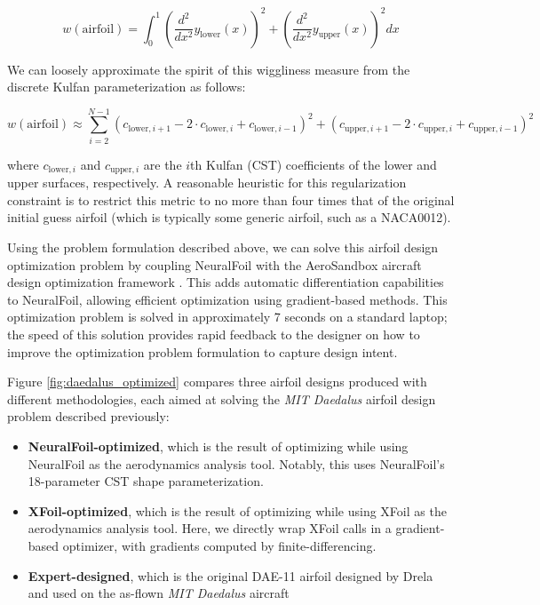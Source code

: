 $$w(\mathrm{airfoil}) = \int_0^1 \left( \frac{d^2}{dx^2} y_\mathrm{lower}(x) \right)^2 + \left( \frac{d^2}{dx^2} y_\mathrm{upper}(x) \right)^2 dx$$

\noindent We can loosely approximate the spirit of this wiggliness measure from the discrete Kulfan parameterization as follows:

$$w(\mathrm{airfoil}) \approx \sum_{i=2}^{N-1} \left(c_{\mathrm{lower},i+1} - 2 \cdot c_{\mathrm{lower},i} + c_{\mathrm{lower},i-1} \right)^2 + \left(c_{\mathrm{upper},i+1} - 2 \cdot c_{\mathrm{upper},i} + c_{\mathrm{upper},i-1} \right)^2$$

\noindent where $c_{\mathrm{lower},i}$ and $c_{\mathrm{upper},i}$ are the $i$th Kulfan (CST) coefficients of the lower and upper surfaces, respectively. A reasonable heuristic for this regularization constraint is to restrict this metric to no more than four times that of the original initial guess airfoil (which is typically some generic airfoil, such as a NACA0012).

Using the problem formulation described above, we can solve this airfoil design optimization problem by coupling NeuralFoil with the AeroSandbox aircraft design optimization framework \cite{sharpe_aerosandbox_2021}. This adds automatic differentiation capabilities to NeuralFoil, allowing efficient optimization using gradient-based methods. This optimization problem is solved in approximately 7 seconds on a standard laptop; the speed of this solution provides rapid feedback to the designer on how to improve the optimization problem formulation to capture design intent.

Figure \ref{fig:daedalus_optimized} compares three airfoil designs produced with different methodologies, each aimed at solving the \emph{MIT Daedalus} airfoil design problem described previously:

\begin{itemize}
    \item \textbf{NeuralFoil-optimized}, which is the result of optimizing while using NeuralFoil as the aerodynamics analysis tool. Notably, this uses NeuralFoil's 18-parameter CST shape parameterization.
    \item \textbf{XFoil-optimized}, which is the result of optimizing while using XFoil as the aerodynamics analysis tool. Here, we directly wrap XFoil calls in a gradient-based optimizer, with gradients computed by finite-differencing.
    \item \textbf{Expert-designed}, which is the original DAE-11 airfoil designed by Drela \cite{drela_lowreynoldsnumber_1988} and used on the as-flown \emph{MIT Daedalus} aircraft
\end{itemize}

